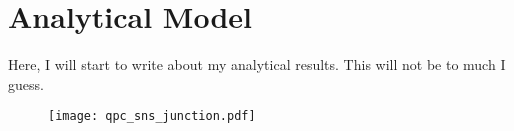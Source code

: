 \chapter{Analytical Model}
\label{ch:analyticalmodel}

Here, I will start to write about my analytical results. This will not be to much I guess.

\begin{figure}
\texttt{[image: qpc\_sns\_junction.pdf]}
\end{figure}
